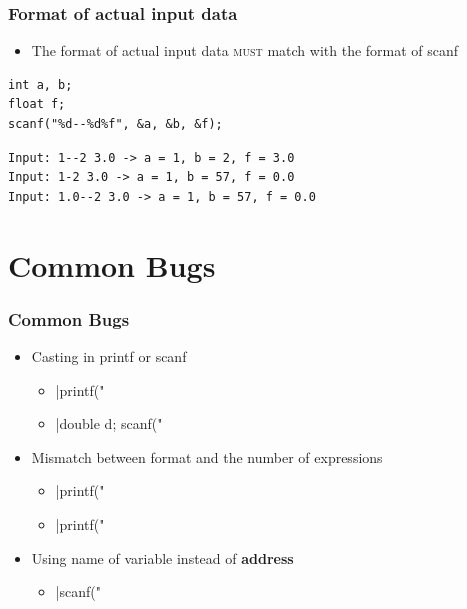 \documentclass{../c-lecture}
\begin{document}
\begin{frame}[fragile]
  \frametitle{Format of actual input data}
  \begin{itemize}
    \item
      The format of actual input data \textsc{\color{YellowOrange} must} match
      with the format of scanf

  \end{itemize}
  \begin{verbatim}
int a, b;
float f;
scanf("%d--%d%f", &a, &b, &f);
  \end{verbatim}
  \begin{verbatim}
Input: 1--2 3.0 -> a = 1, b = 2, f = 3.0
Input: 1-2 3.0 -> a = 1, b = 57, f = 0.0
Input: 1.0--2 3.0 -> a = 1, b = 57, f = 0.0
  \end{verbatim}
\end{frame}

\section{Common Bugs}

\begin{frame}[fragile]
  \frametitle{Common Bugs}
  \begin{itemize}
    \item Casting in printf or scanf
    \begin{itemize}
      \item {}|printf("%
      \item {}|double d; scanf("%
    \end{itemize}
    \item Mismatch between format and the number of expressions
    \begin{itemize}
      \item {}|printf("%
      \item {}|printf("%
    \end{itemize}
    \item
      Using name of variable instead of \textbf{\color{Orange} address}
    \begin{itemize}
      \item {}|scanf("%
    \end{itemize}
  \end{itemize}
\end{frame}
\end{document}
